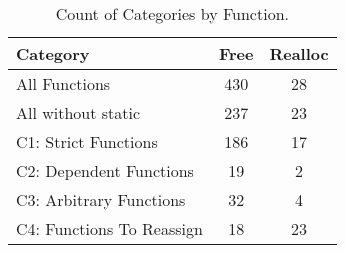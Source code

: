 \begin{table}[H]
   \begin{center}
   \begin{tabularx}{0.6\linewidth}{l|c|c}

      Category & Free & Realloc \\
      \hline

      All Functions& 430 & 28 \\

      All without static& 237 & 23 \\

      C1: Strict Functions& 186 & 17 \\

      C2: Dependent Functions& 19 & 2 \\

      C3: Arbitrary Functions& 32 & 4 \\

      C4: Functions To Reassign& 18 & 23 \\

   \end{tabularx}
\end{center}
   \caption{Count of Categories by Function.}
   \label{tab:categories:overview}
\end{table}

